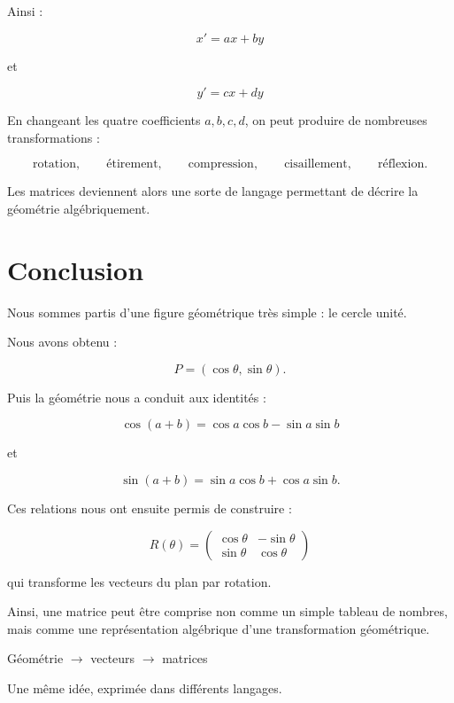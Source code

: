 \documentclass[11pt,a4paper]{article}
\newcommand{\sectiontitle}[1]{
    \section{#1}
}
\begin{document}
Ainsi :

\[
\boxed{
x'=ax+by
}
\]

et

\[
\boxed{
y'=cx+dy
}
\]

En changeant les quatre coefficients $a,b,c,d$,
on peut produire de nombreuses transformations :

\[
\text{rotation},
\qquad
\text{étirement},
\qquad
\text{compression},
\qquad
\text{cisaillement},
\qquad
\text{réflexion}.
\]

Les matrices deviennent alors une sorte de langage permettant
de décrire la géométrie algébriquement.


\sectiontitle{Conclusion}

Nous sommes partis d'une figure géométrique très simple :
le cercle unité.

Nous avons obtenu :

\[
P=(\cos\theta,\sin\theta).
\]

Puis la géométrie nous a conduit aux identités :

\[
\cos(a+b)
=
\cos a\cos b-\sin a\sin b
\]

et

\[
\sin(a+b)
=
\sin a\cos b+\cos a\sin b.
\]

Ces relations nous ont ensuite permis de construire :

\[
\boxed{
R(\theta)=
\begin{pmatrix}
\cos\theta&-\sin\theta\\
\sin\theta&\cos\theta
\end{pmatrix}
}
\]

qui transforme les vecteurs du plan par rotation.

Ainsi, une matrice peut être comprise non comme un simple tableau
de nombres, mais comme une représentation algébrique d'une
transformation géométrique.

\begin{center}

\vspace{1cm}

{\Large\color{accent}
Géométrie $\rightarrow$ vecteurs $\rightarrow$ matrices
}

\vspace{0.4cm}

{\color{muted}
Une même idée, exprimée dans différents langages.
}

\end{center}
\end{document}
